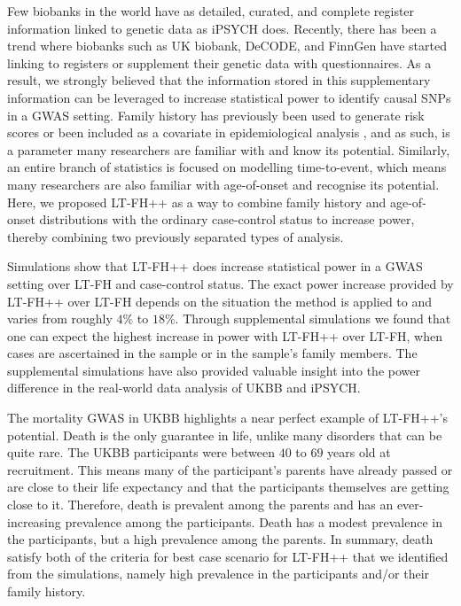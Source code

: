 
Few biobanks in the world have as detailed, curated, and complete register information linked to genetic data as iPSYCH does. Recently, there has been a trend where biobanks such as UK biobank, DeCODE, and FinnGen have started linking to registers or supplement their genetic data with questionnaires. As a result, we strongly believed that the information stored in this supplementary information can be leveraged to increase statistical power to identify causal SNPs in a GWAS setting. Family history has previously been used to generate risk scores \cite{kannel1990contribution,splansky2007third} or been included as a covariate in epidemiological analysis \cite{ejlskov2021prediction,schendel2022evaluating}, and as such, is a parameter many researchers are familiar with and know its potential. Similarly, an entire branch of statistics is focused on modelling time-to-event, which means many researchers are also familiar with age-of-onset and recognise its potential. Here, we proposed LT-FH++ as a way to combine family history and age-of-onset distributions with the ordinary case-control status to increase power, thereby combining two previously separated types of analysis.

Simulations show that LT-FH++ does increase statistical power in a GWAS setting over LT-FH and case-control status. The exact power increase provided by LT-FH++ over LT-FH depends on the situation the method is applied to and varies from roughly $ 4\% $ to $ 18\% $. Through supplemental simulations we found that one can expect the highest increase in power with LT-FH++ over LT-FH, when cases are ascertained in the sample or in the sample's family members. The supplemental simulations have also provided valuable insight into the power difference in the real-world data analysis of UKBB and iPSYCH.

The mortality GWAS in UKBB highlights a near perfect example of LT-FH++'s potential. Death is the only guarantee in life, unlike many disorders that can be quite rare. The UKBB participants were between $ 40 $ to $ 69 $ years old at recruitment. This means many of the participant's parents have already passed or are close to their life expectancy and that the participants themselves are getting close to it. Therefore, death is prevalent among the parents and has an ever-increasing prevalence among the participants. Death has a modest prevalence in the participants, but a high prevalence among the parents. In summary, death satisfy both of the criteria for best case scenario for LT-FH++ that we identified from the simulations, namely high prevalence in the participants and/or their family history. 

